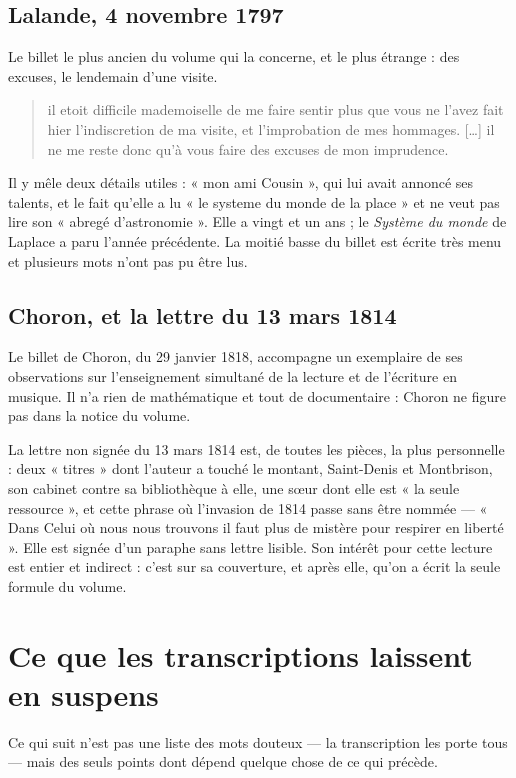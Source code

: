 \documentclass[11pt,a4paper]{article}
\begin{document}
\subsection*{Lalande, 4 novembre 1797}

Le billet le plus ancien du volume qui la concerne, et le plus étrange : des
excuses, le lendemain d'une visite.
\begin{quote}
il etoit difficile mademoiselle de me faire sentir plus que vous ne l'avez fait
hier l'indiscretion de ma visite, et l'improbation de mes hommages. […] il ne
me reste donc qu'à vous faire des excuses de mon imprudence.
\end{quote}
Il y mêle deux détails utiles : « mon ami Cousin », qui lui avait annoncé ses
talents, et le fait qu'elle a lu « le systeme du monde de la place » et ne veut
pas lire son « abregé d'astronomie ». Elle a vingt et un ans ; le \emph{Système
du monde} de Laplace a paru l'année précédente. La moitié basse du billet est
écrite très menu et plusieurs mots n'ont pas pu être lus.

\subsection*{Choron, et la lettre du 13 mars 1814}

Le billet de Choron, du 29 janvier 1818, accompagne un exemplaire de ses
observations sur l'enseignement simultané de la lecture et de l'écriture en
musique. Il n'a rien de mathématique et tout de documentaire : Choron ne figure
pas dans la notice du volume.

La lettre non signée du 13 mars 1814 est, de toutes les pièces, la plus
personnelle : deux « titres » dont l'auteur a touché le montant, Saint-Denis et
Montbrison, son cabinet contre sa bibliothèque à elle, une sœur dont elle est
« la seule ressource », et cette phrase où l'invasion de 1814 passe sans être
nommée --- « Dans Celui où nous nous trouvons il faut plus de mistère pour
respirer en liberté ». Elle est signée d'un paraphe sans lettre lisible. Son
intérêt pour cette lecture est entier et indirect : c'est sur sa couverture, et
après elle, qu'on a écrit la seule formule du volume.

\section*{Ce que les transcriptions laissent en suspens}

Ce qui suit n'est pas une liste des mots douteux --- la transcription les porte
tous --- mais des seuls points dont dépend quelque chose de ce qui précède.
\end{document}
